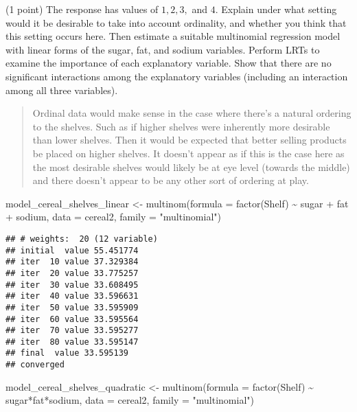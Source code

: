 \documentclass[
  11pt,
]{article}
\newenvironment{Shaded}{\begin{snugshade}}{\end{snugshade}}
\newcommand{\AttributeTok}[1]{\textcolor[rgb]{0.77,0.63,0.00}{#1}}
\newcommand{\FunctionTok}[1]{\textcolor[rgb]{0.00,0.00,0.00}{#1}}
\newcommand{\NormalTok}[1]{#1}
\newcommand{\OtherTok}[1]{\textcolor[rgb]{0.56,0.35,0.01}{#1}}
\newcommand{\SpecialCharTok}[1]{\textcolor[rgb]{0.00,0.00,0.00}{#1}}
\newcommand{\StringTok}[1]{\textcolor[rgb]{0.31,0.60,0.02}{#1}}
\begin{document}
(1 point) The response has values of \(1, 2, 3,\) and \(4\). Explain
under what setting would it be desirable to take into account
ordinality, and whether you think that this setting occurs here. Then
estimate a suitable multinomial regression model with linear forms of
the sugar, fat, and sodium variables. Perform LRTs to examine the
importance of each explanatory variable. Show that there are no
significant interactions among the explanatory variables (including an
interaction among all three variables).

\begin{quote}
Ordinal data would make sense in the case where there's a natural
ordering to the shelves. Such as if higher shelves were inherently more
desirable than lower shelves. Then it would be expected that better
selling products be placed on higher shelves. It doesn't appear as if
this is the case here as the most desirable shelves would likely be at
eye level (towards the middle) and there doesn't appear to be any other
sort of ordering at play.
\end{quote}

\begin{Shaded}
\begin{Highlighting}[]
\NormalTok{model\_cereal\_shelves\_linear    }\OtherTok{\textless{}{-}} \FunctionTok{multinom}\NormalTok{(}\AttributeTok{formula =} \FunctionTok{factor}\NormalTok{(Shelf) }\SpecialCharTok{\textasciitilde{}}\NormalTok{ sugar }\SpecialCharTok{+}\NormalTok{ fat }\SpecialCharTok{+}\NormalTok{ sodium, }\AttributeTok{data =}\NormalTok{ cereal2, }\AttributeTok{family =} \StringTok{"multinomial"}\NormalTok{)}
\end{Highlighting}
\end{Shaded}

\begin{verbatim}
## # weights:  20 (12 variable)
## initial  value 55.451774 
## iter  10 value 37.329384
## iter  20 value 33.775257
## iter  30 value 33.608495
## iter  40 value 33.596631
## iter  50 value 33.595909
## iter  60 value 33.595564
## iter  70 value 33.595277
## iter  80 value 33.595147
## final  value 33.595139 
## converged
\end{verbatim}

\begin{Shaded}
\begin{Highlighting}[]
\NormalTok{model\_cereal\_shelves\_quadratic }\OtherTok{\textless{}{-}} \FunctionTok{multinom}\NormalTok{(}\AttributeTok{formula =} \FunctionTok{factor}\NormalTok{(Shelf) }\SpecialCharTok{\textasciitilde{}}\NormalTok{ sugar}\SpecialCharTok{*}\NormalTok{fat}\SpecialCharTok{*}\NormalTok{sodium, }\AttributeTok{data =}\NormalTok{ cereal2, }\AttributeTok{family =} \StringTok{"multinomial"}\NormalTok{)}
\end{Highlighting}
\end{Shaded}
\end{document}
